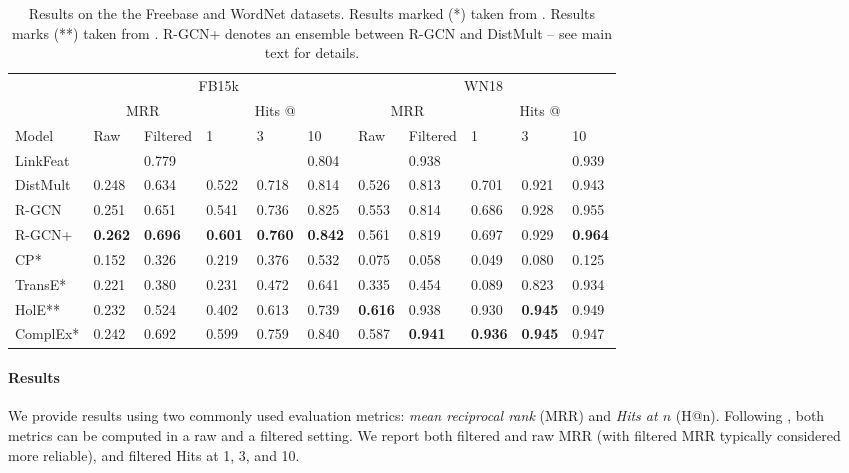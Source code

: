 \begin{table*}[t!]
\centering
\begin{tabular}{@{}lllllllllll@{}}
\toprule
      & \multicolumn{5}{c}{FB15k}                             & \multicolumn{5}{c}{WN18}                            \\ \cmidrule(lr){2-6} \cmidrule(l){7-11}
      & \multicolumn{2}{c}{MRR} & \multicolumn{3}{c}{Hits @} & \multicolumn{2}{c}{MRR} & \multicolumn{3}{c}{Hits @} \\ \cmidrule(lr){2-3} \cmidrule(lr){4-6} \cmidrule(lr){7-8} \cmidrule(l){9-11}
Model & Raw      & Filtered     & 1       & 3      & 10      & Raw      & Filtered     & 1       & 3      & 10      \\ \midrule
LinkFeat 		&  & 0.779 & & & 0.804 & & 0.938 & & & 0.939 \\
\midrule
DistMult 		& 0.248 & 0.634 & 0.522 & 0.718 & 0.814 & 0.526 & 0.813 & 0.701 & 0.921 & 0.943 \\
R-GCN  			& 0.251 & 0.651 & 0.541 & 0.736 & 0.825 & 0.553 & 0.814 & 0.686 & 0.928 & 0.955 \\
R-GCN+			& \textbf{0.262} & \textbf{0.696} & \textbf{0.601} & \textbf{0.760} & \textbf{0.842} & 0.561 & 0.819 & 0.697 & 0.929 & \textbf{0.964}  \\ \midrule
CP* & 0.152 & 0.326 & 0.219 & 0.376 & 0.532 & 0.075 & 0.058 & 0.049 & 0.080 & 0.125 \\
TransE* 		& 0.221 & 0.380 & 0.231 & 0.472 & 0.641 & 0.335 & 0.454 & 0.089 & 0.823 & 0.934 \\
HolE** 			& 0.232 & 0.524 & 0.402 & 0.613 & 0.739 & \textbf{0.616} & 0.938 & 0.930 & \textbf{0.945} & 0.949\\
ComplEx* 		& 0.242 & 0.692 & 0.599 & 0.759 & 0.840 & 0.587 & \textbf{0.941} & \textbf{0.936} & \textbf{0.945} & 0.947 \\ \bottomrule
\end{tabular}
\caption{Results on the the Freebase and WordNet datasets. Results marked (*) taken from \citet{complex-complex_embeddings_for_simple_link_prediction}. Results marks (**) taken from \citet{nickel2015holographic}. R-GCN+ denotes an ensemble between R-GCN and DistMult -- see main text for details.}
\label{table:link-results}
\end{table*}

\paragraph{Results}
We provide results using two commonly used evaluation metrics: \textit{mean reciprocal rank} (MRR) and \textit{Hits at $n$} (H@n).
Following \citet{bordes2013translating}, both metrics can be computed in a raw and a filtered setting. We report both filtered and raw MRR (with filtered MRR typically considered more reliable), and filtered Hits at 1, 3, and 10.

